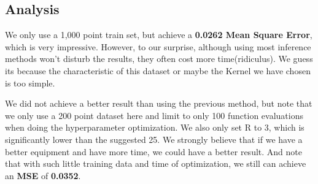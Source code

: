 \subsection{Analysis}
We only use a 1,000 point train set, but achieve a \textbf{0.0262 Mean Square Error}, which is very impressive.
However, to our surprise, although using most inference methods won't disturb the results, they often cost more time(ridiculus). We guess its because the characteristic of this dataset or maybe the Kernel we have chosen is too simple.

We did not achieve a better result than using the previous method, but note that we only use a 200 point dataset here and limit to only 100 function evaluations when doing the hyperparameter optimization. We also only set R to 3, which is significantly lower than the suggested 25.
We strongly believe that if we have a better equipment and have more time, we could have a better result.
And note that with such little training data and time of optimization, we still can achieve an \textbf{MSE} of \textbf{0.0352}.






